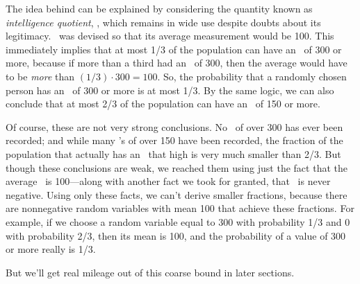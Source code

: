 The idea behind  can be explained by considering
the quantity known as \emph{intelligence quotient}, \idx{\IQ}, which
remains in wide use despite doubts about its legitimacy.  \IQ\ was
devised so that its average measurement would be 100.  This
immediately implies that at most 1/3 of the population can have an
\IQ\ of 300 or more, because if more than a third had an \IQ\ of 300,
then the average would have to be \emph{more} than $(1/3)\cdot 300 =
100$.  So, the probability that a randomly chosen person has an
\IQ\ of 300 or more is at most 1/3.  By the same logic, we can also
conclude that at most 2/3 of the population can have an \IQ\ of 150 or
more.

Of course, these are not very strong conclusions.  No \IQ\ of over 300
has ever been recorded; and while many \IQ's of over 150 have been
recorded, the fraction of the population that actually has an
\IQ\ that high is very much smaller than 2/3.  But though these
conclusions are weak, we reached them using just the fact that the
average \IQ\ is 100---along with another fact we took for granted,
that \IQ\ is never negative.  Using only these facts, we can't
derive smaller fractions, because there are nonnegative random
variables with mean 100 that achieve these fractions.  For example, if
we choose a random variable equal to 300 with probability 1/3 and 0
with probability 2/3, then its mean is 100, and the probability of a
value of 300 or more really is 1/3.  \begin{editingnotes}
But we'll get real mileage out of
this coarse bound in later sections.
\end{editingnotes}


